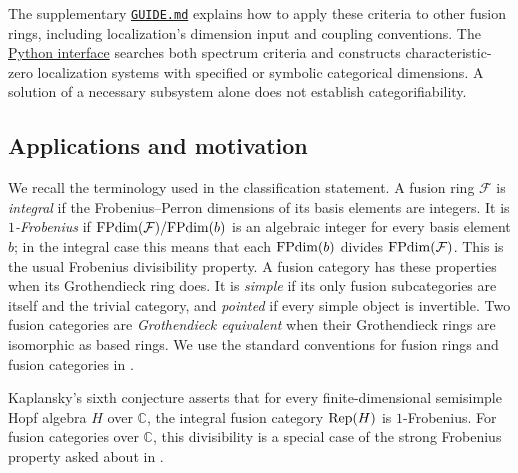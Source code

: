\documentclass{amsart}
\begin{document}
The supplementary \href{https://github.com/sebastienpalcoux/triangular-prism-categorification/blob/f816c697fde088b261e1fe1ce703980e5dbdab51/GUIDE.md}{\texttt{GUIDE.md}} explains how to apply these criteria to other fusion rings, including localization's dimension input and coupling conventions. The \href{https://github.com/sebastienpalcoux/triangular-prism-categorification/blob/f816c697fde088b261e1fe1ce703980e5dbdab51/criteria.py}{Python interface} searches both spectrum criteria and constructs characteristic-zero localization systems with specified or symbolic categorical dimensions. A solution of a necessary subsystem alone does not establish categorifiability.

\subsection*{Applications and motivation}
We recall the terminology used in the classification statement. A fusion ring $\mathcal F$ is \emph{integral} if the Frobenius--Perron dimensions of its basis elements are integers. It is \emph{$1$-Frobenius} if $\mathrm{FPdim}(\mathcal F)/\mathrm{FPdim}(b)$ is an algebraic integer for every basis element $b$; in the integral case this means that each $\mathrm{FPdim}(b)$ divides $\mathrm{FPdim}(\mathcal F)$. This is the usual Frobenius divisibility property. A fusion category has these properties when its Grothendieck ring does. It is \emph{simple} if its only fusion subcategories are itself and the trivial category, and \emph{pointed} if every simple object is invertible. Two fusion categories are \emph{Grothendieck equivalent} when their Grothendieck rings are isomorphic as based rings. We use the standard conventions for fusion rings and fusion categories in \cite{Lus,ENO05,EGNO15}.

Kaplansky's sixth conjecture \cite{Kap75} asserts that for every finite-dimensional semisimple Hopf algebra $H$ over $\mathbb C$, the integral fusion category $\mathrm{Rep}(H)$ is $1$-Frobenius. For fusion categories over $\mathbb C$, this divisibility is a special case of the strong Frobenius property asked about in \cite[Question~1]{ENO11}.
\end{document}

